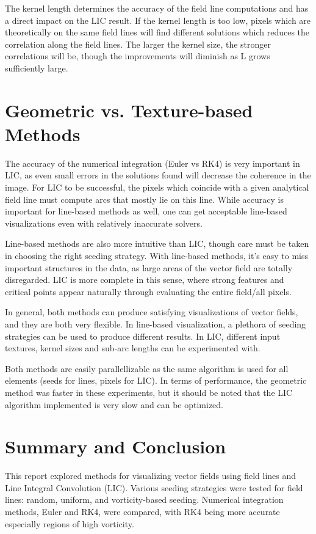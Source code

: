 \documentclass{article}
\begin{document}
The kernel length determines the accuracy of the field line computations and has a direct impact on the LIC result.
If the kernel length is too low, pixels which are theoretically on the same field lines will find different solutions which reduces
the correlation along the field lines. The larger the kernel size, the stronger correlations will be, though the improvements will diminish as L grows sufficiently large.

\section{Geometric vs. Texture-based Methods}
The accuracy of the numerical integration (Euler vs RK4) is very important in LIC, as even small errors in the solutions found will decrease the coherence in the image.
For LIC to be successful, the pixels which coincide with a given analytical field line must compute arcs that mostly lie on this line. While accuracy is important
for line-based methods as well, one can get acceptable line-based visualizations even with relatively inaccurate solvers.

Line-based methods are also more intuitive than LIC, though care must be taken in choosing the right seeding strategy. With line-based methods, it's easy to miss
important structures in the data, as large areas of the vector field are totally disregarded. LIC is more complete in this sense, where strong features and critical points
appear naturally through evaluating the entire field/all pixels.

In general, both methods can produce satisfying visualizations of vector fields, and they are
both very flexible. In line-based visualization, a plethora of seeding strategies can be used to produce different results.
In LIC, different input textures, kernel sizes and sub-arc lengths can be experimented with.

Both methods are easily parallellizable as the same algorithm is used for all elements (seeds for lines, pixels for LIC). In terms of performance, the geometric method
was faster in these experiments, but it should be noted that the LIC algorithm implemented is very slow and can be optimized.

\section{Summary and Conclusion}
This report explored methods for visualizing vector fields using field lines and Line Integral Convolution (LIC). Various seeding strategies were tested for field lines: random, uniform, and vorticity-based seeding. Numerical integration methods, Euler and RK4, were compared, with RK4 being more accurate especially regions of high vorticity.
\end{document}
